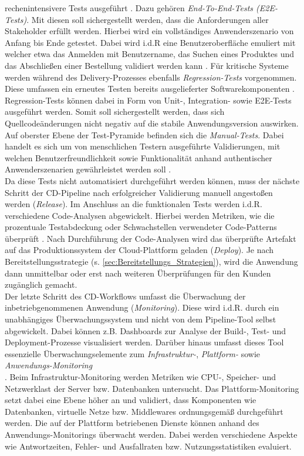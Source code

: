 rechenintensivere Tests ausgeführt \cite{Bose.20230220}. Dazu gehören \textit{End-To-End-Tests (\acs{E2E-Test}s)}. Mit diesen soll sichergestellt werden, dass die Anforderungen aller Stakeholder erfüllt werden. Hierbei wird ein vollständiges Anwenderszenario von Anfang bis Ende getestet. Dabei wird i.d.R eine Benutzeroberfläche emuliert mit welcher etwa das Anmelden mit Benutzername, das Suchen eines Produktes und das Abschließen einer Bestellung validiert werden kann \cite{Bose.20230220}. Für kritische Systeme werden während des Delivery-Prozesses ebenfalls \textit{Regression-Tests} vorgenommen. Diese umfassen ein erneutes Testen bereits ausgelieferter Softwarekomponenten \cite[S. 15 ff.]{Engstrom.2010}. Regression-Tests können dabei in Form von Unit-, Integration- sowie E2E-Tests ausgeführt werden. Somit soll sichergestellt werden, dass sich Quellcodeänderungen nicht negativ auf die stabile Anwendungsversion auswirken. Auf oberster Ebene der Test-Pyramide befinden sich die \textit{Manual-Tests}. Dabei handelt es sich um von menschlichen Testern ausgeführte Validierungen, mit welchen Benutzerfreundlichkeit sowie Funktionalität anhand authentischer Anwenderszenarien gewährleistet werden soll \cite{Guru99.2020}.\\ Da diese Tests nicht automatisiert durchgeführt werden können, muss der nächste Schritt der CD-Pipeline nach erfolgreicher Validierung manuell angestoßen werden (\textit{Release}). Im Anschluss an die funktionalen Tests werden i.d.R. verschiedene Code-Analysen abgewickelt. Hierbei werden Metriken, wie die prozentuale Testabdeckung oder Sch\-wachstellen verwendeter Code-Patterns überprüft \cite[146]{Rangnau.10520201082020}. Nach Durchführung der Code-Analysen wird das überprüfte Artefakt auf das Produktionssystem der Cloud-Plattform geladen (\textit{Deploy}). Je nach Bereitstellungsstrategie (s. \ref{sec:Bereitstellungs_Strategien}), wird die Anwendung dann unmittelbar oder erst nach weiteren Überprüfungen für den Kunden zugänglich gemacht.\\ Der letzte Schritt des CD-Workflows umfasst die Überwachung der inbetriebgenommenen Anwendung (\textit{Monitoring}). Diese wird i.d.R. durch ein unabhängiges Überwachungssystem und nicht von dem Pipeline-Tool selbst abgewickelt. Dabei können z.B. Dashboards zur Analyse der Build-, Test- und Deployment-Prozesse visualisiert werden. Darüber hinaus umfasst dieses Tool essenzielle Überwa\-chungselemente zum \textit{Infrastruktur-}, \textit{Plattform-} sowie \textit{Anwendungs-Monitoring} \cite{VMware.2022}\\ \cite{Datadog.2021}\cite{.2023}. Beim Infra\-struktur-Monitoring werden Metriken wie CPU-, Speicher- und Netzwerklast der Server bzw. Datenbanken untersucht. Das Plattform-Monitoring setzt dabei eine Ebene höher an und validiert, dass Komponenten wie Datenbanken, virtuelle Netze bzw. Middlewares ordnungsgemäß durchgeführt werden. Die auf der Plattform betriebenen Dienste können anhand des Anwendungs-Monitorings überwacht werden. Dabei werden verschiedene Aspekte wie Antwortzeiten, Fehler- und Ausfallraten bzw. Nutzungsstatistiken evaluiert.\\ 
